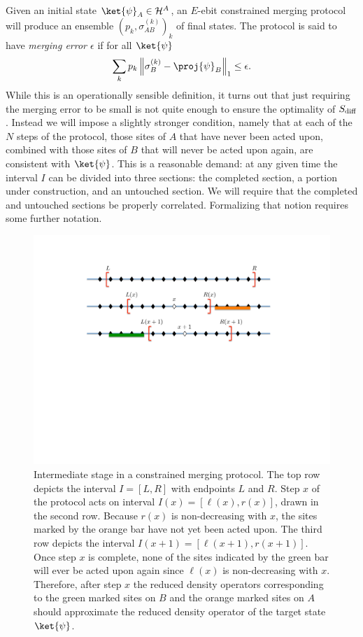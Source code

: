 \documentclass[12pt]{article}
\def\sdiff{S_{\rm diff}}
\begin{document}
Given an initial state $\ket{\psi}_A \in \mathcal{H}^A$, an $E$-ebit constrained merging protocol will produce an ensemble $( p_k, \sigma_{AB}^{(k)} )_k$ of final states. The protocol is said to have \emph{merging error $\epsilon$} if for all $\ket{\psi}$
\begin{equation} \label{eqn:merging-error}
\sum_k p_k \left\|
 \sigma_B^{(k)} - \proj{\psi}_B
\right\|_1 \leq \epsilon.
\end{equation}
While this is an operationally sensible definition, it turns out that just requiring the merging error to be small is not quite enough to ensure the optimality of $\sdiff$. Instead we will impose a slightly stronger condition, namely that at each of the $N$ steps of the protocol, those sites of $A$ that have never been acted upon, combined with those sites of $B$ that will never be acted upon again, are consistent with $\ket{\psi}$. This is a reasonable demand: at any given time the interval $I$ can be divided into three sections: the completed section, a portion under construction, and an untouched section. We will require that the completed and untouched sections be properly correlated. Formalizing that notion requires some further notation.

\begin{figure}[t!]
\centering
\includegraphics[width=.70\textwidth]{intervals.pdf}
\caption{Intermediate stage in a constrained merging protocol. The top row depicts the interval $I = [L,R]$ with endpoints $L$ and $R$. Step $x$ of the protocol acts on interval $I(x) = [\ell(x),r(x)]$, drawn in the second row. Because $r(x)$ is non-decreasing with $x$, the sites marked by the orange bar have not yet been acted upon. The third row depicts the interval $I(x+1) = [\ell(x+1),r(x+1)]$. Once step $x$ is complete, none of the sites indicated by the green bar will ever be acted upon again since $\ell(x)$ is non-decreasing with $x$. Therefore, after step $x$ the reduced density operators corresponding to the green marked sites on $B$ and the orange marked sites on $A$ should approximate the reduced density operator of the target state $\ket{\psi}$.}
\label{intervals}
\end{figure}
\end{document}
